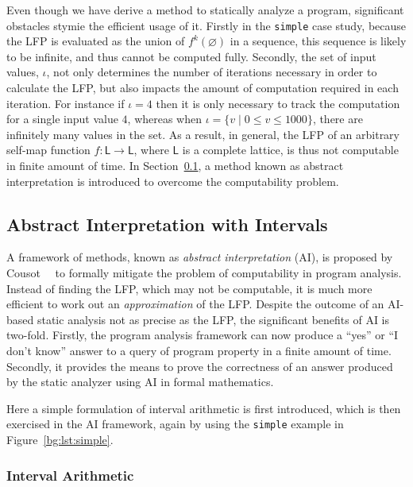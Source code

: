 Even though we have derive a method to statically analyze a program,
significant obstacles stymie the efficient usage of it.  Firstly in the
\verb|simple| case study, because the LFP is evaluated as the union of
$f^k(\varnothing)$ in a sequence, this sequence is likely to be infinite,
and thus cannot be computed fully.  Secondly, the set of input values,
$\iota$, not only determines the number of iterations necessary in order to
calculate the LFP, but also impacts the amount of computation required in
each iteration.  For instance if $\iota = {4}$ then it is only necessary to
track the computation for a single input value $4$, whereas when $\iota =
\{ v \mid 0 \leq v \leq 1000 \}$, there are infinitely many values in the
set.  As a result, in general, the LFP of an arbitrary self-map function $f:
\mathsf{L} \to \mathsf{L}$, where $\mathsf{L}$ is a complete lattice, is thus
not computable in finite amount of time.  In Section~\ref{bg:sub:intervals},
a method known as abstract interpretation is introduced to overcome the
computability problem.


\subsection{Abstract Interpretation with Intervals}
\label{bg:sub:intervals}

A framework of methods, known as \emph{abstract interpretation} (AI), is
proposed by Cousot~\etal~\cite{cousot77} to formally mitigate the problem of
computability in program analysis.  Instead of finding the LFP, which may not
be computable, it is much more efficient to work out an \emph{approximation} of
the LFP\@.  Despite the outcome of an AI-based static analysis not as precise
as the LFP, the significant benefits of AI is two-fold.  Firstly, the program
analysis framework can now produce a ``yes'' or ``I don't know'' answer to a
query of program property in a finite amount of time.  Secondly, it provides
the means to prove the correctness of an answer produced by the static analyzer
using AI in formal mathematics.

Here a simple formulation of interval arithmetic is first introduced, which is
then exercised in the AI framework, again by using the \verb|simple| example in
Figure~\ref{bg:lst:simple}.

\subsubsection{Interval Arithmetic}
\label{bg:ssub:interval}

